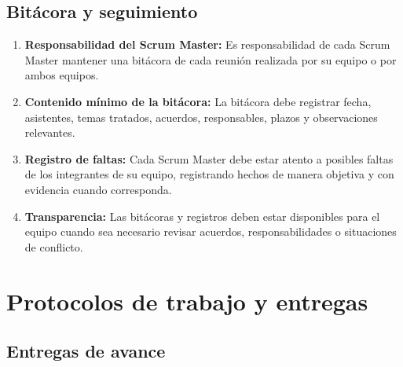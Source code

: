 \documentclass[12pt,a4paper]{article}
\begin{document}
\subsection{Bitácora y seguimiento}

\begin{enumerate}
    \item \textbf{Responsabilidad del Scrum Master:} Es responsabilidad de cada Scrum Master mantener una bitácora de cada reunión realizada por su equipo o por ambos equipos.

    \item \textbf{Contenido mínimo de la bitácora:} La bitácora debe registrar fecha, asistentes, temas tratados, acuerdos, responsables, plazos y observaciones relevantes.

    \item \textbf{Registro de faltas:} Cada Scrum Master debe estar atento a posibles faltas de los integrantes de su equipo, registrando hechos de manera objetiva y con evidencia cuando corresponda.

    \item \textbf{Transparencia:} Las bitácoras y registros deben estar disponibles para el equipo cuando sea necesario revisar acuerdos, responsabilidades o situaciones de conflicto.
\end{enumerate}

\section{Protocolos de trabajo y entregas}

\subsection{Entregas de avance}
\end{document}
